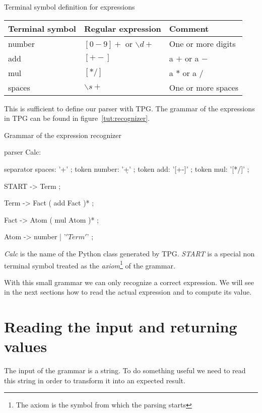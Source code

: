 \begin{tableau}
\caption{Terminal symbol definition for expressions}		\label{tut:token_calc}
\begin{tabular}{| l | l | l |}
\hline
	Terminal symbol & Regular expression & Comment \\
\hline
\hline
	number & $[0-9]+$ or $\backslash d+$ & One or more digits \\
\hline
	add & $[+-]$ & a $+$ or a $-$ \\
\hline
	mul & $[*/]$ & a $*$ or a $/$ \\
\hline
	spaces & $\backslash s+$ & One or more spaces \\
\hline
\end{tabular}
\end{tableau}

This is sufficient to define our parser with TPG. The grammar of the expressions in TPG can be found in figure~\ref{tut:recognizer}.

\begin{code}
\caption{Grammar of the expression recognizer}				\label{tut:recognizer}
\begin{verbatimtab}[4]
parser Calc:

	separator spaces: '\s+' ;
	token number: '\d+' ;
	token add: '[+-]' ;
	token mul: '[*/]' ;

	START -> Term ;

	Term -> Fact ( add Fact )* ;

	Fact -> Atom ( mul Atom )* ;

	Atom -> number | '\(' Term '\)' ;
\end{verbatimtab}
\end{code}

\emph{Calc} is the name of the Python class generated by TPG. \emph{START} is a special non terminal symbol treated as the \emph{axiom}\footnote{The axiom is the symbol from which the parsing starts} of the grammar.

With this small grammar we can only recognize a correct expression. We will see in the next sections how to read the actual expression and to compute its value.

\section{Reading the input and returning values}

The input of the grammar is a string. To do something useful we need to read this string in order to transform it into an expected result.

